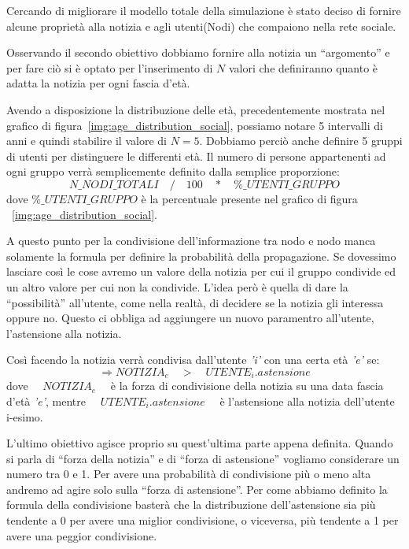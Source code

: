 Cercando di migliorare il modello totale della simulazione è stato deciso di fornire alcune proprietà alla notizia e 
agli utenti(Nodi) che compaiono nella rete sociale.

Osservando il secondo obiettivo dobbiamo fornire alla notizia un ``argomento'' e per fare ciò si 
è optato per l'inserimento di $N$ valori che definiranno quanto è adatta la notizia per ogni fascia d'età.

Avendo a disposizione la distribuzione delle età, precedentemente mostrata nel grafico di figura~\ref{img:age_distribution_social},
possiamo notare 5 intervalli di anni e quindi stabilire il valore di $N = 5$.
\newpage
Dobbiamo perciò anche definire 5 gruppi di utenti per distinguere le differenti età.
Il numero di persone appartenenti ad ogni gruppo verrà semplicemente definito dalla semplice proporzione:
\begin{equation*}
N\_NODI\_TOTALI \quad / \quad 100 \quad * \quad \%\_UTENTI\_GRUPPO
\end{equation*}
dove $\%\_UTENTI\_GRUPPO$ è la percentuale presente nel grafico di figura ~\ref{img:age_distribution_social}.

A questo punto per la condivisione dell'informazione tra nodo e nodo manca solamente la formula per definire la probabilità 
della propagazione.
Se dovessimo lasciare così le cose avremo un valore della notizia per cui il gruppo condivide ed un altro 
valore per cui non la condivide.
L'idea però è quella di dare la ``possibilità'' all'utente, come nella realtà, di decidere se la 
notizia gli interessa oppure no. 
Questo ci obbliga ad aggiungere un nuovo paramentro all'utente, l'astensione alla notizia.

Così facendo la notizia verrà condivisa dall'utente \emph{'i'} con una certa età \emph{'e'} se:
\begin{equation*}
\Rightarrow NOTIZIA_e \quad > \quad UTENTE_i.astensione
\end{equation*}
dove $\quad NOTIZIA_e \quad$ è la forza di condivisione della notizia su una data fascia d'età \emph{'e'}, 
mentre $\quad UTENTE_i.astensione \quad$ è l'astensione alla notizia dell'utente i-esimo.

L'ultimo obiettivo agisce proprio su quest'ultima parte appena definita.
Quando si parla di ``forza della notizia'' e di ``forza di astensione'' vogliamo considerare un numero tra 0 e 1.
Per avere una probabilità di condivisione più o meno alta andremo ad agire solo sulla ``forza di astensione''.
Per come abbiamo definito la formula della condivisione basterà che la distribuzione dell'astensione sia più 
tendente a 0 per avere una miglior condivisione, o viceversa, più tendente a 1 per avere una peggior
condivisione.


